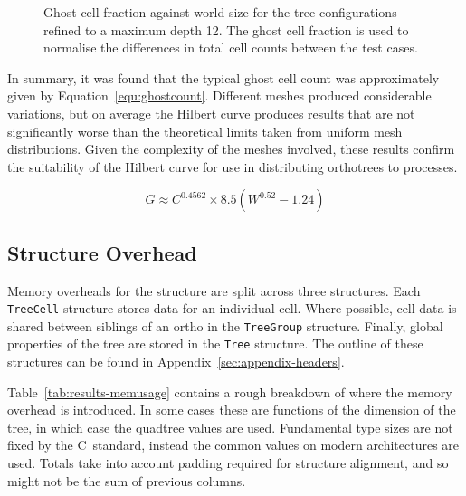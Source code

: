 \documentclass[twoside]{IIBproject}
\def\CC{{C\nolinebreak[4]\hspace{-.05em}\raisebox{.4ex}{\tiny\bf ++}}}
\numberwithin{figure}{section}
\begin{document}
        \tikzset{external/export next=false}
        \begin{figure}[!htbp]
            \centering
            
            \caption{Ghost cell fraction against world size for the tree configurations refined to a maximum depth 12. The ghost cell fraction is used to normalise the differences in total cell counts between the test cases.}
            \label{fig:anal-borderworldsize}
        \end{figure}

        In summary, it was found that the typical ghost cell count was approximately given by Equation~\ref{equ:ghostcount}. Different meshes produced considerable variations, but on average the Hilbert curve produces results that are not significantly worse than the theoretical limits taken from uniform mesh distributions. Given the complexity of the meshes involved, these results confirm the suitability of the Hilbert curve for use in distributing orthotrees to processes.

        \begin{equation}
            G \approx C^{0.4562} \times 8.5(W^{0.52}-1.24)
            \label{equ:ghostcount}
        \end{equation}



    \clearpage
    \subsection{Structure Overhead} %
        \label{sec:results-memoryuse}

        Memory overheads for the structure are split across three structures. Each \texttt{TreeCell} structure stores data for an individual cell. Where possible, cell data is shared between siblings of an ortho in the \texttt{TreeGroup} structure. Finally, global properties of the tree are stored in the \texttt{Tree} structure. The outline of these structures can be found in Appendix~\ref{sec:appendix-headers}.

        Table~\ref{tab:results-memusage} contains a rough breakdown of where the memory overhead is introduced. In some cases these are functions of the dimension of the tree, in which case the quadtree values are used. Fundamental type sizes are not fixed by the \CC~standard, instead the common values on modern architectures are used. Totals take into account padding required for structure alignment, and so might not be the sum of previous columns.
\end{document}
